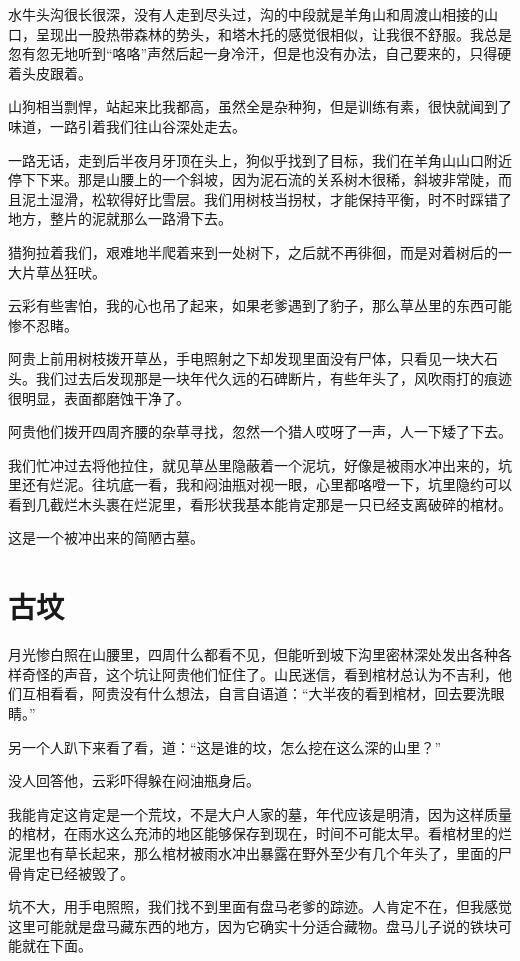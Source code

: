 水牛头沟很长很深，没有人走到尽头过，沟的中段就是羊角山和周渡山相接的山口，呈现出一股热带森林的势头，和塔木托的感觉很相似，让我很不舒服。我总是忽有忽无地听到“咯咯”声然后起一身冷汗，但是也没有办法，自己要来的，只得硬着头皮跟着。

山狗相当剽悍，站起来比我都高，虽然全是杂种狗，但是训练有素，很快就闻到了味道，一路引着我们往山谷深处走去。

一路无话，走到后半夜月牙顶在头上，狗似乎找到了目标，我们在羊角山山口附近停下下来。那是山腰上的一个斜坡，因为泥石流的关系树木很稀，斜坡非常陡，而且泥土湿滑，松软得好比雪层。我们用树枝当拐杖，才能保持平衡，时不时踩错了地方，整片的泥就那么一路滑下去。

猎狗拉着我们，艰难地半爬着来到一处树下，之后就不再徘徊，而是对着树后的一大片草丛狂吠。

云彩有些害怕，我的心也吊了起来，如果老爹遇到了豹子，那么草丛里的东西可能惨不忍睹。

阿贵上前用树枝拨开草丛，手电照射之下却发现里面没有尸体，只看见一块大石头。我们过去后发现那是一块年代久远的石碑断片，有些年头了，风吹雨打的痕迹很明显，表面都磨蚀干净了。

阿贵他们拨开四周齐腰的杂草寻找，忽然一个猎人哎呀了一声，人一下矮了下去。

我们忙冲过去将他拉住，就见草丛里隐蔽着一个泥坑，好像是被雨水冲出来的，坑里还有烂泥。往坑底一看，我和闷油瓶对视一眼，心里都咯噔一下，坑里隐约可以看到几截烂木头裹在烂泥里，看形状我基本能肯定那是一只已经支离破碎的棺材。

这是一个被冲出来的简陋古墓。

\chapter{古坟}

月光惨白照在山腰里，四周什么都看不见，但能听到坡下沟里密林深处发出各种各样奇怪的声音，这个坑让阿贵他们怔住了。山民迷信，看到棺材总认为不吉利，他们互相看看，阿贵没有什么想法，自言自语道：“大半夜的看到棺材，回去要洗眼睛。”

另一个人趴下来看了看，道：“这是谁的坟，怎么挖在这么深的山里？”

没人回答他，云彩吓得躲在闷油瓶身后。

我能肯定这肯定是一个荒坟，不是大户人家的墓，年代应该是明清，因为这样质量的棺材，在雨水这么充沛的地区能够保存到现在，时间不可能太早。看棺材里的烂泥里也有草长起来，那么棺材被雨水冲出暴露在野外至少有几个年头了，里面的尸骨肯定已经被毁了。

坑不大，用手电照照，我们找不到里面有盘马老爹的踪迹。人肯定不在，但我感觉这里可能就是盘马藏东西的地方，因为它确实十分适合藏物。盘马儿子说的铁块可能就在下面。

